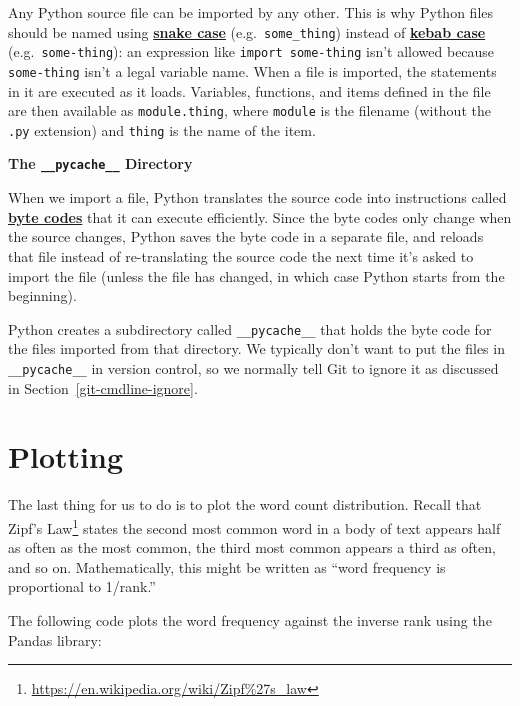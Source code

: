 \documentclass[
]{krantz}
\renewenvironment{quote}{\begin{VF}}{\end{VF}}
\renewcommand{\href}[2]{#2\footnote{\url{#1}}}
\newcommand{\gref}[2]{\hyperlink{#2}{\textbf{#1}}}
\begin{document}
Any Python source file can be imported by any other.
This is why Python files should be named using \gref{snake case}{snake\_case}
(e.g.~\texttt{some\_thing})
instead of \gref{kebab case}{kebab\_case}
(e.g.~\texttt{some-thing}):
an expression like \texttt{import\ some-thing} isn't allowed
because \texttt{some-thing} isn't a legal variable name.
When a file is imported,
the statements in it are executed as it loads.
Variables, functions, and items defined in the file are then available as \texttt{module.thing},
where \texttt{module} is the filename (without the \texttt{.py} extension)
and \texttt{thing} is the name of the item.

\begin{quote}
\textbf{The \texttt{\_\_pycache\_\_} Directory}

When we import a file,
Python translates the source code into instructions called \gref{byte codes}{byte\_code}
that it can execute efficiently.
Since the byte codes only change when the source changes,
Python saves the byte code in a separate file,
and reloads that file instead of re-translating the source code
the next time it's asked to import the file
(unless the file has changed,
in which case Python starts from the beginning).

Python creates a subdirectory called \texttt{\_\_pycache\_\_}
that holds the byte code for the files imported from that directory.
We typically don't want to put the files in \texttt{\_\_pycache\_\_} in version control,
so we normally tell Git to ignore it as discussed in Section~\ref{git-cmdline-ignore}.
\end{quote}

\hypertarget{scripting-plotting}{%
\section{Plotting}\label{scripting-plotting}}

The last thing for us to do is to plot the word count distribution.
Recall that \href{https://en.wikipedia.org/wiki/Zipf\%27s_law}{Zipf's Law} states the second most common word in a body of text
appears half as often as the most common,
the third most common appears a third as often, and so on.
Mathematically, this might be written as
``word frequency is proportional to 1/rank.''

The following code plots the word frequency against the inverse rank
using the Pandas library:
\end{document}
